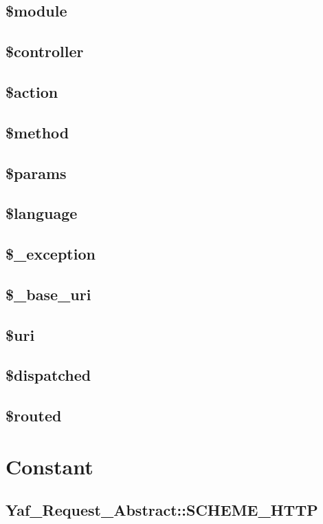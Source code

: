 \subsection{\$module}

\subsection{\$controller}
\subsection{\$action}
\subsection{\$method}
\subsection{\$params}
\subsection{\$language}
\subsection{\$\_exception}
\subsection{\$\_base\_uri}
\subsection{\$uri}
\subsection{\$dispatched}
\subsection{\$routed}



\section{Constant}


\subsection{Yaf\_Request\_Abstract::SCHEME\_HTTP}

